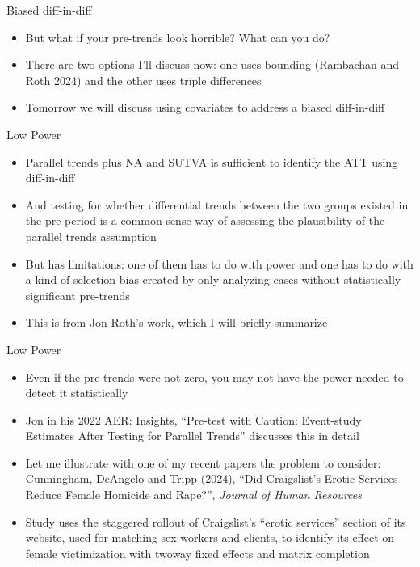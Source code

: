 \documentclass{beamer}
\begin{document}
\begin{frame}{Biased diff-in-diff}

\begin{itemize}

\item But what if your pre-trends look horrible?  What can you do?
\item There are two options I'll discuss now: one uses bounding (Rambachan and Roth 2024) and the other uses triple differences
\item Tomorrow we will discuss using covariates to address a biased diff-in-diff

\end{itemize}

\end{frame}

\begin{frame}{Low Power}

\begin{itemize}

\item Parallel trends plus NA and SUTVA is sufficient to identify the ATT using diff-in-diff
\item And testing for whether differential trends between the two groups existed in the pre-period is a common sense way of assessing the plausibility of the parallel trends assumption
\item But has limitations: one of them has to do with power and one has to do with a kind of selection bias created by only analyzing cases without statistically significant pre-trends
\item This is from Jon Roth's work, which I will briefly summarize

\end{itemize}

\end{frame}

\begin{frame}{Low Power}

\begin{itemize}

\item Even if the pre-trends were not zero, you may not have the power needed to detect it statistically
\item Jon in his 2022 AER: Insights, ``Pre-test with Caution: Event-study Estimates After Testing for Parallel Trends'' discusses this in detail
\item Let me illustrate with one of my recent papers the problem to consider: Cunningham, DeAngelo and Tripp (2024), ``Did Craigslist's Erotic Services Reduce Female Homicide and Rape?'', \emph{Journal of Human Resources}
\item Study uses the staggered rollout of Craigslist's ``erotic services'' section of its website, used for matching sex workers and clients, to identify its effect on female victimization with twoway fixed effects and matrix completion


\end{itemize}

\end{frame}
\end{document}
